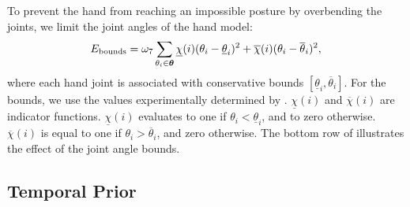 To prevent the hand from reaching an impossible posture by overbending the joints, we limit the joint angles of the hand model:
\begin{equation}
   E_{\text{bounds}} = \omega_7 \sum_{\theta_i \in \boldsymbol{\theta}}
        \underline{\chi}(i)(\theta_i - \underline{\theta}_i)^2
            +
        \overline{\chi}(i)(\theta_i - \overline{\theta}_i)^2,
        \label{eq:bound}
\end{equation}
%
where each hand joint is associated with conservative bounds $\left[ \underline{\theta}_i,\overline{\theta}_i\right]$. For the bounds, we use the values experimentally determined by \cite{chan1995weighted}.  {$\underline{\chi}(i)$} and {$\overline{\chi}(i)$} are indicator functions. {$\underline{\chi}(i)$} evaluates to one if $\theta_i < \underline{\theta}_i$, and to zero otherwise. $\overline{\chi}(i)$ is equal to one if $\theta_i > \overline{\theta}_i$, and  zero otherwise.
The bottom row of  illustrates the effect of the joint angle bounds.






\subsection*{Temporal Prior}

